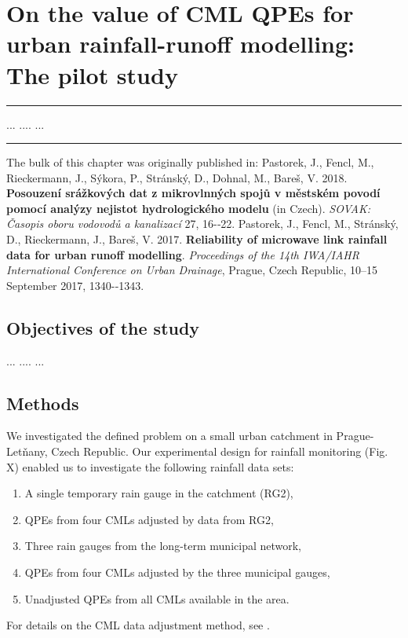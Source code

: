 \documentclass{ctuthesis}\usepackage[]{graphicx}\usepackage[]{color}
\begin{document}

\chapter{On the value of CML QPEs for urban rainfall-runoff modelling: The pilot study} \label{chap4}

\rule{\textwidth}{0.4pt}
... \newline
....\newline
... \newline
\rule[0.2cm]{\textwidth}{0.4pt}

{\footnotesize The bulk of this chapter was originally published in: \newline
\-\hspace{0.5cm}
Pastorek, J., Fencl, M., Rieckermann, J., Sýkora, P., Stránský, D., Dohnal, M., Bareš, V. 2018. \textbf{Posouzení srážkových dat z mikrovlnných spojů v městském povodí pomocí analýzy nejistot hydrologického modelu} (in Czech). \emph{SOVAK: Časopis oboru vodovodů a kanalizací} 27, 16-‐22. \newline
\-\hspace{0.5cm}
Pastorek, J., Fencl, M., Stránský, D., Rieckermann, J., Bareš, V. 2017. \textbf{Reliability of microwave link rainfall data for urban runoff modelling}. \emph{Proceedings of the 14th IWA/IAHR International Conference on Urban Drainage}, Prague, Czech Republic, 10--15 September 2017, 1340-‐1343.
}
\newpage


\section{Objectives of the study}

...
....
...

 
\section{Methods} \label{paperIMnM}

We investigated the defined problem on a small urban catchment in Prague-Letňany, Czech Republic. Our experimental design for rainfall monitoring (Fig. X) enabled us to investigate the following rainfall data sets: 
\begin{enumerate}
        \item A single temporary rain gauge in the catchment (RG2),
        \item QPEs from four CMLs adjusted by data from RG2, 
        \item Three rain gauges from the long-term municipal network,
        \item QPEs from four CMLs adjusted by the three municipal gauges,
        \item Unadjusted QPEs from all CMLs available in the area.
\end{enumerate}
For details on the CML data adjustment method, see \cite{fenclGaugeadjustedRainfallEstimates2017}. 
\end{document}
